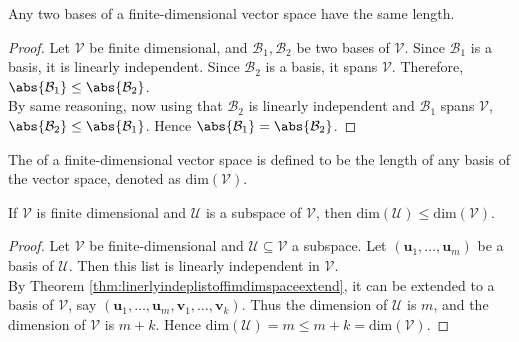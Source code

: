 \begin{theorem} Any two bases of a finite-dimensional vector space have the same length.
\begin{proof}
Let $\mathcal{V}$ be finite dimensional, and $\mathcal{B}_1, \mathcal{B}_2$ be two bases of $\mathcal{V}$. Since $\mathcal{B}_1$ is a basis, it is linearly independent. Since $\mathcal{B}_2$ is a basis, it spans $\mathcal{V}$. Therefore, $\abs{\mathcal{B}_1} \leq \abs{\mathcal{B}_2}$.\\
By same reasoning, now using that $\mathcal{B}_2$ is linearly independent and $\mathcal{B}_1$ spans $\mathcal{V}$, $\abs{\mathcal{B}_2} \leq \abs{\mathcal{B}_1}$. Hence $\abs{\mathcal{B}_1} = \abs{\mathcal{B}_2}$.
\end{proof}
\end{theorem}

\begin{definition} The  of a finite-dimensional vector space is defined to be the length of any basis of the vector space, denoted as $\text{dim}(\mathcal{V})$.
\end{definition}

\begin{proposition} If $\mathcal{V}$ is finite dimensional and $\mathcal{U}$ is a subspace of $\mathcal{V}$, then $\text{dim}(\mathcal{U}) \leq \text{dim}(\mathcal{V})$.
\begin{proof} Let $\mathcal{V}$ be finite-dimensional and $\mathcal{U} \subseteq \mathcal{V}$ a subspace. Let $(\mathbf{u}_1, \ldots, \mathbf{u}_m)$ be a basis of $\mathcal{U}$. Then this list is linearly independent in $\mathcal{V}$.\\
By Theorem \ref{thm:linerlyindeplistoffimdimspaceextend}, it can be extended to a basis of $\mathcal{V}$, say $(\mathbf{u}_1, \ldots, \mathbf{u}_m, \mathbf{v}_1, \ldots, \mathbf{v}_k)$. Thus the dimension of $\mathcal{U}$ is $m$, and the dimension of $\mathcal{V}$ is $m+k$. Hence $\text{dim}(\mathcal{U}) = m \leq m+k = \text{dim}(\mathcal{V})$.
\end{proof}
\end{proposition}

